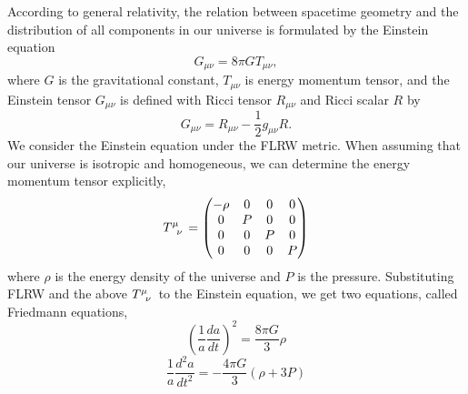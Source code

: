 \documentclass[11pt, a4paper]{article}
\begin{document}
According to general relativity, the relation between spacetime geometry and the distribution of all components in our universe is 
formulated by the Einstein equation
\begin{equation}
    G_{\mu \nu} = 8 \pi G T_{\mu \nu},
\end{equation}
where $G$ is the gravitational constant, $T_{\mu \nu}$ is energy momentum tensor, 
and the Einstein tensor $G_{\mu \nu}$ is defined with Ricci tensor $R_{\mu \nu}$ and Ricci scalar $R$ by 
\begin{equation}
    G_{\mu \nu} = R_{\mu \nu} - \frac{1}{2}g_{\mu \nu} R.
\end{equation}
We consider the Einstein equation under the FLRW metric.
When assuming that our universe is isotropic and homogeneous, 
we can determine the energy momentum tensor explicitly,
\begin{equation}
    \tensor{T}{^\mu_\nu} = 
    \begin{pmatrix}
        - \rho & 0 & 0 & 0\\
        0 & P & 0 & 0 \\
        0 & 0 & P & 0 \\
        0 & 0 & 0 & P
    \end{pmatrix}
\end{equation}
where $\rho$ is the energy density of the universe and $P$ is the pressure.
Substituting FLRW and the above $\tensor{T}{^\mu_\nu}$ to the Einstein equation, we get two equations, called Friedmann equations,
\begin{equation}
    \left( \frac{1}{a} \frac{d a}{dt} \right)^2 = \frac{8 \pi G}{3} \rho
\end{equation}
\begin{equation}
    \frac{1}{a}\frac{d^2 a}{dt^2} = - \frac{4 \pi G}{3}\left( \rho + 3 P \right)
\end{equation}
\end{document}
